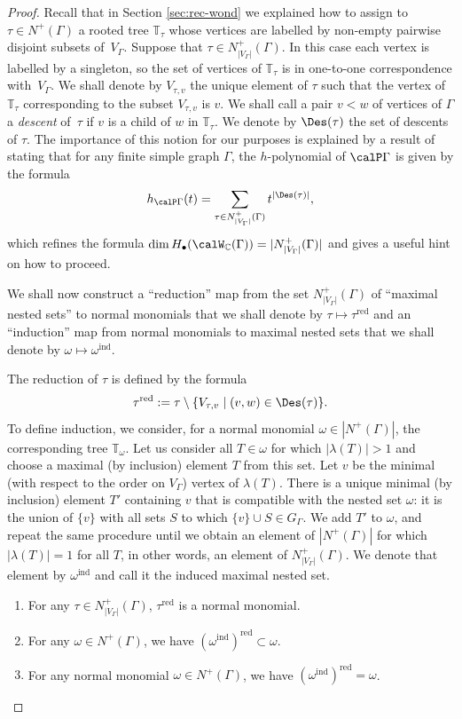 \begin{proof}
Recall that in Section \ref{sec:rec-wond} we explained how to assign to $\tau\in N^+(\Gamma)$ a rooted tree $\mathbb{T}_\tau$ whose vertices are labelled by non-empty pairwise disjoint subsets of~$V_\Gamma$. Suppose that $\tau\in N^+_{|V_\Gamma|}(\Gamma)$. In this case each vertex is labelled by a singleton, so the set of vertices of $\mathbb{T}_\tau$ is in one-to-one  correspondence with~$V_\Gamma$. We shall denote by $V_{\tau,v}$ the unique element of $\tau$ such that the vertex of $\mathbb{T}_\tau$ corresponding to the subset $V_{\tau,v}$ is $v$. We shall call a pair $v<w$ of vertices of $\Gamma$ a \emph{descent} of~$\tau$ \cite{MR2520477} if $v$ is a child of $w$ in $\mathbb{T}_\tau$. We denote by $\Des(\tau)$ the set of descents of $\tau$. The importance of this notion for our purposes is explained by a result of \cite{MR2520477} stating that for any finite simple graph $\Gamma$, the $h$-polynomial of $\calP\Gamma$ is given by the formula
\[h_{\calP\Gamma}(t)=\sum_{\tau\in N^+_{|V_\Gamma|}(\Gamma)} t^{|\Des(\tau)|},\]
which refines the formula $\dim H_{\bullet}(\calW_{\mathbb{C}}(\Gamma))=|N^+_{|V_\Gamma|}(\Gamma)|$ and gives a useful hint on how to proceed.

We shall now construct a ``reduction'' map from the set $N^+_{|V_\Gamma|}(\Gamma)$ of ``maximal nested sets'' to normal monomials that we shall denote by $\tau\mapsto \tau^{\mathrm{red}}$ and an ``induction'' map from normal monomials to maximal nested sets that we shall denote by $\omega\mapsto \omega^{\mathrm{ind}}$.

The reduction of $\tau$ is defined by the formula
 \[
\tau^{\mathrm{red}}:=\tau\setminus\{V_{\tau,v}\mid (v,w)\in\Des(\tau)\}.
 \]
To define induction, we consider, for a normal monomial $\omega\in |N^+(\Gamma)|$, the corresponding tree $\mathbb{T}_\omega$. Let us consider all $T\in\omega$ for which $|\lambda(T)|>1$ and choose a maximal (by inclusion) element $T$ from this set. Let $v$ be the minimal (with respect to the order on $V_\Gamma$) vertex of $\lambda(T)$. There is a unique minimal (by inclusion) element $T'$ containing $v$ that is compatible with the nested set $\omega$: it is the union of $\{v\}$ with all sets $S$ to which $\{v\}\cup S\in G_\Gamma$. We add $T'$ to $\omega$, and repeat the same procedure until we obtain an element of $|N^+(\Gamma)|$  for which $|\lambda(T)|=1$ for all $T$, in other words, an element of $N^+_{|V_\Gamma|}(\Gamma)$. We denote that element by $\omega^{\mathrm{ind}}$ and call it the induced maximal nested set.

\begin{lemma}\leavevmode
\begin{enumerate}
\item For any $\tau\in N^+_{|V_\Gamma|}(\Gamma)$, $\tau^{\mathrm{red}}$ is a normal monomial.   
\item For any $\omega\in N^+(\Gamma)$, we have $(\omega^{\mathrm{ind}})^{\mathrm{red}}\subset\omega$.
\item For any normal monomial $\omega\in N^+(\Gamma)$, we have $(\omega^{\mathrm{ind}})^{\mathrm{red}}=\omega$.
\end{enumerate}
\end{lemma}


\end{proof}
